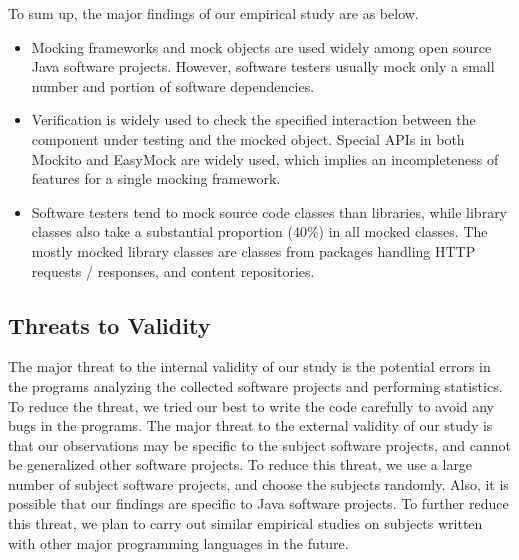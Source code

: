 To sum up, the major findings of our empirical study are as below.
\begin{itemize}
\item Mocking frameworks and mock objects are used widely among open source Java software projects. However, software testers usually mock only a small number and portion of software dependencies.

\item Verification is widely used to check the specified interaction between the component under testing and the mocked object. Special APIs in both Mockito and EasyMock are widely used, which implies an incompleteness of features for a single mocking framework. 

\item Software testers tend to mock source code classes than libraries, while library classes also take a substantial proportion (40\%) in all mocked classes. The mostly mocked library classes are classes from packages handling HTTP requests / responses, and content repositories. 

\end{itemize}
\vspace{-0.3cm}

\subsection{Threats to Validity}
\label{subsec:threat}
\vspace{-0.3cm}

The major threat to the internal validity of our study is the potential errors in the programs analyzing the collected software projects and performing statistics. To reduce the threat, we tried our best to write the code carefully to avoid any bugs in the programs. The major threat to the external validity of our study is that our observations may be specific to the subject software projects, and cannot be generalized other software projects. To reduce this threat, we use a large number of subject software projects, and choose the subjects randomly. Also, it is possible that our findings are specific to Java software projects. To further reduce this threat, we plan to carry out similar empirical studies on subjects written with other major programming languages in the future. 


